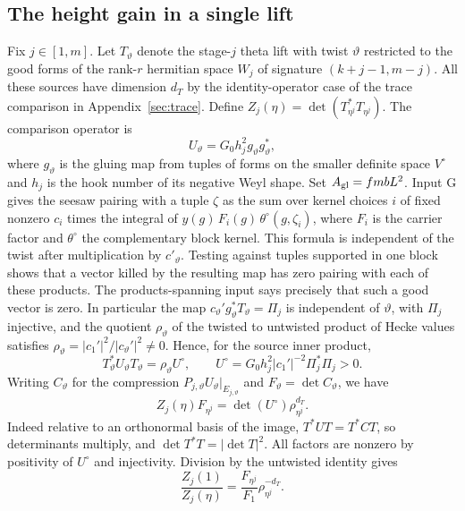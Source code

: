 \subsection{The height gain in a single lift}\label{c3:single}

Fix $j\in[1,m]$. Let $T_\vartheta$ denote the stage-$j$ theta lift with twist $\vartheta$ restricted to the good forms of the rank-$r$ hermitian space $W_j$ of signature $(k+j-1,m-j)$. All these
sources have dimension $d_T$ by the identity-operator case of the
trace comparison in Appendix~\ref{sec:trace}. Define $Z_j(\eta)=\det(T_{\eta^j}^*T_{\eta^j})$.
The comparison operator is
\[
 U_\vartheta=G_0 h_j^2 g_\vartheta g_\vartheta^* ,
\]
where $g_\vartheta$ is the gluing map from tuples of forms on the
smaller definite space $V^\circ$ and $h_j$ is the hook number of its
negative Weyl shape. Set $A_{\rm gl}=fmbL^2$. Input G gives the seesaw pairing with a tuple $\zeta$ as the sum
over kernel choices $i$ of fixed nonzero $c_i$ times the integral
of $y(g)\,F_i(g)\,\theta^\circ(g,\zeta_i)$, where $F_i$ is the
carrier factor and $\theta^\circ$ the complementary block kernel.
This formula is independent of the twist after multiplication
by $c'_\vartheta$. Testing against tuples supported in one block
shows that a vector killed by the resulting map has zero pairing
with each of these products. The products-spanning input says
precisely that such a good vector is zero. In particular the map
$c_\vartheta' g_\vartheta^*T_\vartheta=\Pi_j$
is independent of $\vartheta$, with $\Pi_j$ injective, and
the quotient $\rho_\vartheta$ of the twisted to untwisted product of
Hecke values satisfies
$\rho_\vartheta=|c_1'|^2/|c_\vartheta'|^2\ne0$.
Hence, for the source inner product,
\[
 T_\vartheta^*U_\vartheta T_\vartheta
 =\rho_\vartheta U^\circ,
 \qquad U^\circ=G_0h_j^2|c_1'|^{-2}\Pi_j^*\Pi_j>0.
\]
Writing $C_\vartheta$ for the compression
$P_{j,\vartheta}U_\vartheta|_{E_{j,\vartheta}}$ and
$F_\vartheta=\det C_\vartheta$, we have
\[
 Z_j(\eta) F_{\eta^j}=\det(U^\circ)\rho_{\eta^j}^{d_T}.
\]
Indeed relative to an orthonormal basis of the image,
$T^*UT=T^*C T$, so determinants multiply, and $\det T^*T=|\det T|^2$.
All factors are nonzero by positivity of $U^\circ$ and injectivity.
Division by the untwisted identity gives
\begin{equation}\label{c3:compression}
 \frac{Z_j(1)}{Z_j(\eta)}
 =\frac{F_{\eta^j}}{F_1}\rho_{\eta^j}^{-d_T}.
\end{equation}

